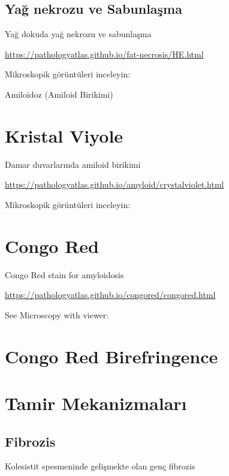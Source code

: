 \documentclass[
  letterpaper,
  DIV=11,
  numbers=noendperiod]{scrreprt}
\begin{document}
\hypertarget{yaux11f-nekrozu-ve-sabunlaux15fma}{%
\section{Yağ nekrozu ve
Sabunlaşma}\label{yaux11f-nekrozu-ve-sabunlaux15fma}}

Yağ dokuda yağ nekrozu ve sabunlaşma

\url{https://pathologyatlas.github.io/fat-necrosis/HE.html}

Mikroskopik görüntüleri inceleyin:

Amiloidoz (Amiloid Birikimi)

\hypertarget{kristal-viyole}{%
\chapter{Kristal Viyole}\label{kristal-viyole}}

Damar duvarlarında amiloid birikimi

\url{https://pathologyatlas.github.io/amyloid/crystalviolet.html}

Mikroskopik görüntüleri inceleyin:

\hypertarget{congo-red}{%
\chapter{Congo Red}\label{congo-red}}

Congo Red stain for amyloidosis

\url{https://pathologyatlas.github.io/congored/congored.html}

See Microscopy with viewer:

\hypertarget{congo-red-birefringence}{%
\chapter{Congo Red Birefringence}\label{congo-red-birefringence}}

\hypertarget{tamir-mekanizmalarux131}{%
\chapter{Tamir Mekanizmaları}\label{tamir-mekanizmalarux131}}

\hypertarget{fibrozis}{%
\section{Fibrozis}\label{fibrozis}}

Kolesistit spesmeninde gelişmekte olan genç fibrozis
\end{document}
